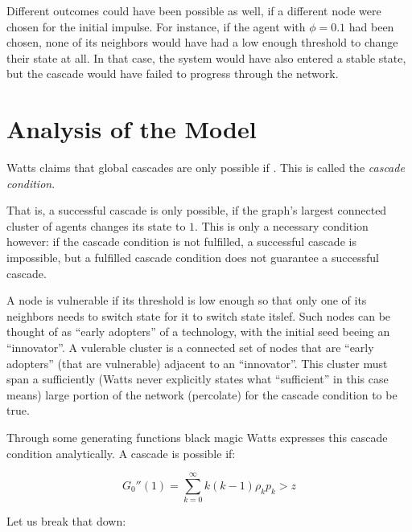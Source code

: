 \documentclass{sig-alternate-05-2015}
\begin{document}
Different outcomes could have been possible as well, if a different node were chosen for the initial impulse. For instance, if the agent with $\phi = 0.1$ had been chosen, none of its neighbors would have had a low enough threshold to change their state at all. In that case, the system would have also entered a stable state, but the cascade would have failed to progress through the network.


\section{Analysis of the Model}\label{sec:analysis}

Watts claims that global cascades are only possible if . This is called the \emph{cascade condition}.

That is, a successful cascade is only possible, if the graph's largest connected cluster of agents changes its state to $1$. This is only a necessary condition however: if the cascade condition is not fulfilled, a successful cascade is impossible, but a fulfilled cascade condition does not guarantee a successful cascade.

A node is vulnerable if its threshold is low enough so that only one of its neighbors needs to switch state for it to switch state itslef. Such nodes can be thought of as ``early adopters'' of a technology, with the initial seed beeing an ``innovator''. A vulerable cluster is a connected set of nodes that are ``early adopters'' (that are vulnerable) adjacent to an ``innovator''. This cluster must span a sufficiently (Watts never explicitly states what ``sufficient'' in this case means) large portion of the network (percolate) for the cascade condition to be true.

Through some generating functions black magic Watts expresses this cascade condition analytically. A cascade is possible if:

\begin{equation}
  G_0''(1) = \sum_{k=0}^\infty k (k-1) \rho_k p_k > z
\end{equation}

Let us break that down:
\end{document}
